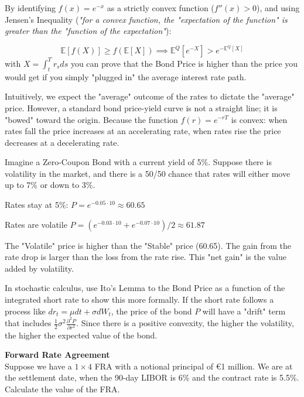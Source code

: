 \documentclass[12pt,a4paper]{exam}
\begin{document}
\begin{questions}
\begin{solution}
By identifying $f(x)=e^{-x}$ as a strictly convex function ($f''(x)>0$), and using Jensen's Inequality (\emph{"for a convex function, the "expectation of the function" is greater than the "function of the expectation"}):

\begin{equation*}
\mathbb{E}[f(X)]\geq f(\mathbb{E}[X]) \implies \mathbb{E}^Q[e^{-X}]>e^{-\mathbb{E}^Q[X]}
\end{equation*}
with $X=\int_t^T r_s ds$ you can prove that the Bond Price is higher than the price you would get if you simply "plugged in" the average interest rate path.

Intuitively, we expect the "average" outcome of the rates to dictate the "average" price. However, a standard bond price-yield curve is not a straight line; it is "bowed" toward the origin. Because the function $f(r)=e^{-rT}$ is convex: when rates fall the price increases at an accelerating rate, when rates rise the price decreases at a decelerating rate.

Imagine a Zero-Coupon Bond with a current yield of 5\%. Suppose there is volatility in the market, and there is a 50/50 chance that rates will either move up to 7\% or down to 3\%.

Rates stay at 5\%: $P=e^{-0.05\cdot 10}\approx 60.65$

Rates are volatile $P = (e^{-0.03\cdot10} + e^{-0.07\cdot10})/2 \approx 61.87$

The "Volatile" price is higher than the "Stable" price (60.65).
The gain from the rate drop is larger than the loss from the rate rise. This "net gain" is the value added by volatility.

In stochastic calculus, use Ito's Lemma to the Bond Price as a function of the integrated short rate to show this more formally. If the short rate follows a process like $dr_t=\mu dt+\sigma dW_t$, the price of the bond $P$ will have a "drift" term that includes $\frac{1}{2}\sigma^2\frac{\partial^2 P}{\partial r^2}$.
Since there is a positive convexity, the higher the volatility, the higher the expected value of the bond.
\end{solution}

\question \textbf{Forward Rate Agreement} \\
Suppose we have a $1\times 4$ FRA with a notional principal of €1 million. We are at the settlement date, when the 90-day LIBOR is 6\% and the contract rate is 5.5\%. Calculate the value of the FRA.


\end{questions}
\end{document}

